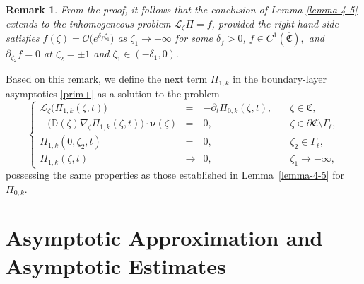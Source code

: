 \documentclass[reqno]{amsart}            %
\newtheorem{remark}{Remark}[section]
\numberwithin{equation}{section}
\begin{document}
	\begin{remark}
		From the proof, it follows that the conclusion of Lemma \ref{lemma-4-5} extends to the inhomogeneous problem \(\mathcal L_\zeta\Pi=f\), provided the right‑hand side satisfies
		\(f(\zeta)=\mathcal O\big(e^{\delta_f\zeta_1}\big)\) as \(\zeta_1\to-\infty\) for some \(\delta_f>0\),
		$f\in C^{1}(\overline{\mathfrak C}),$ and  $\partial_{\zeta_2}f =0$ at $\zeta_2 = \pm 1$ and $\zeta_1 \in (-\delta_1,0).$
	\end{remark}
	
	Based on this remark, we define the next term $\Pi_{1,k}$ in the boundary-layer asymptotics \eqref{prim+} as a solution to 
	the problem
	\begin{equation}\label{prim+probl+1}
		\left\{\begin{array}{rcll}
			\mathcal{L}_{\zeta}\big(\Pi_{1,k}(\zeta,t)\big)
			& =    & - \partial_t \Pi_{0,k}(\zeta,t),
			& \quad \zeta\in \mathfrak{C},
			\\[2mm]
			-\big(\mathbb{D}(\zeta)\nabla_{\zeta}\Pi_{1,k}(\zeta,t)\big) \cdot \boldsymbol{\nu}(\zeta) & =
			& 0,
			& \quad \zeta\in \partial\mathfrak{C} \setminus \Gamma_\ell,
			\\[2mm]
			\Pi_{1, k}(0, {\zeta}_2,t) & =
			& 0,
			& \quad {\zeta}_2\in \Gamma_\ell,
			\\[2mm]
			\Pi_{1, k}(\zeta,t) & \to
			& 0,
			& \quad \zeta_1\to -\infty,
		\end{array}\right.
	\end{equation}
	possessing the same properties as those established in Lemma~\ref{lemma-4-5} for $\Pi_{0,k}.$
	
	
	\section{Asymptotic Approximation and Asymptotic Estimates }\label{Sect-5}
	
\end{document}
